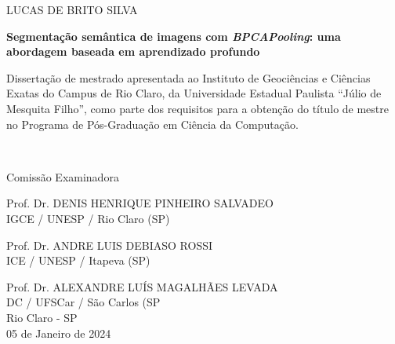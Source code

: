 \newpage
\thispagestyle{empty}

\begin{center}
    {LUCAS DE BRITO SILVA\\}
    
    \vspace{2cm}
    
    \textbf{Segmentação semântica de imagens com \textit{BPCAPooling}: uma abordagem baseada em aprendizado profundo}
    
    \vspace{4cm}
    
    \hspace{.45\linewidth}
    \begin{minipage}{.50\linewidth}
    \small
        Dissertação de mestrado apresentada ao Instituto de Geociências e Ciências Exatas do Campus de Rio Claro, da Universidade Estadual Paulista ``Júlio de Mesquita Filho'', como parte dos requisitos para a obtenção do título de mestre no Programa de Pós-Graduação em Ciência da Computação.
    \end{minipage} \\
    \normalsize
    
    \vspace{1cm}
    
    Comissão Examinadora\\
    
    \vspace{1cm}

    Prof. Dr. DENIS HENRIQUE PINHEIRO SALVADEO\\
    IGCE / UNESP / Rio Claro (SP)\\
    \vspace{0.5cm}


    Prof. Dr. ANDRE LUIS DEBIASO ROSSI\\
    ICE / UNESP / Itapeva (SP)\\
    \vspace{0.5cm}


    Prof. Dr. ALEXANDRE LUÍS MAGALHÃES LEVADA\\
    DC / UFSCar / São Carlos (SP\\

    
    \vspace{2cm}
    Rio Claro - SP \\
    05 de Janeiro de 2024
\end{center}